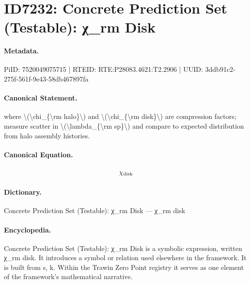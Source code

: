 \section*{ID7232: Concrete Prediction Set (Testable): χ\_rm Disk}
\paragraph{Metadata.}
PiID: 7520049075715 | RTEID: RTE:P28083.4621:T2.2906 | UUID: 3ddb91c2-275f-561f-9e43-58db467897fa

\paragraph{Canonical Statement.}
where \textbackslash{}(\textbackslash{}chi\_\{\textbackslash{}rm halo\}\textbackslash{}) and \textbackslash{}(\textbackslash{}chi\_\{\textbackslash{}rm disk\}\textbackslash{}) are compression factors; measure scatter in \textbackslash{}(\textbackslash{}lambda\_\{\textbackslash{}rm sp\}\textbackslash{}) and compare to expected distribution from halo assembly histories.

\paragraph{Canonical Equation.}
\[
\chi_{\rm disk}
\]

\paragraph{Dictionary.}
Concrete Prediction Set (Testable): χ\_rm Disk — χ\_rm disk

\paragraph{Encyclopedia.}
Concrete Prediction Set (Testable): χ\_rm Disk is a symbolic expression, written χ\_rm disk. It introduces a symbol or relation used elsewhere in the framework. It is built from s, k. Within the Trawin Zero Point registry it serves as one element of the framework's mathematical narrative.
